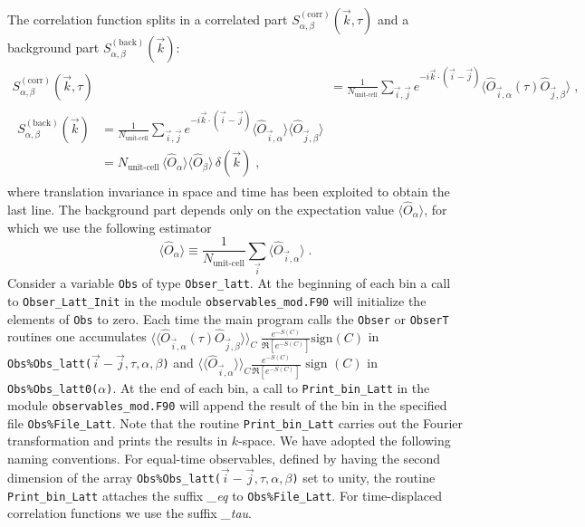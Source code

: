 The correlation function splits in a correlated part $S_{\alpha,\beta}^{\mathrm{(corr)}}(\vec{k},\tau)$ and a background part $S_{\alpha,\beta}^{\mathrm{(back)}}(\vec{k})$:
\begin{align}
S_{\alpha,\beta}^{\mathrm{(corr)}}(\vec{k},\tau)
&=
\frac{1}{N_{\text{unit-cell}}} \sum_{\vec{i},\vec{j}}  e^{- i\vec{k} \cdot \left( \vec{i}-\vec{j}\right) }  \langle \hat{O}_{\vec{i},\alpha} (\tau) \hat{O}_{\vec{j},\beta} \rangle \label{eqn:s_corr} \;,\\
\begin{split}
S_{\alpha,\beta}^{\mathrm{(back)}}(\vec{k})
&=
\frac{1}{N_{\text{unit-cell}}} \sum_{\vec{i},\vec{j}}  e^{- i\vec{k} \cdot \left( \vec{i}-\vec{j}\right) }  \langle \hat{O}_{\vec{i},\alpha} \rangle \langle \hat{O}_{\vec{j},\beta} \rangle\\
&=
N_{\text{unit-cell}}\, \langle \hat{O}_{\alpha} \rangle \langle \hat{O}_{\beta} \rangle \, \delta(\vec{k}) \label{eqn:s_back}\;,
\end{split}
\end{align}
where translation invariance in space and time has been exploited to obtain the last line. 
The background part depends only on the expectation value $\langle \hat{O}_{\alpha} \rangle$, for which we use the following estimator 
\begin{equation}\label{eqn:o}
\langle \hat{O}_{\alpha} \rangle \equiv \frac{1}{N_{\text{unit-cell}}} \sum\limits_{\vec{i}} \langle \hat{O}_{\vec{i},\alpha} \rangle\;.
\end{equation}
Consider a variable  \texttt{Obs} of type  \texttt{Obser\_latt}. At the beginning of each bin a call to  \texttt{Obser\_Latt\_Init} in the module \texttt{observables\_mod.F90}  will  initialize  the elements of \texttt{Obs} to zero.    Each time the main program calls the   \texttt{Obser} or  \texttt{ObserT} routines one accumulates $ \langle \langle \hat{O}_{\vec{i},\alpha} (\tau) \hat{O}_{\vec{j},\beta} \rangle \rangle_{C} \; \frac{e^{-S(C)}} {\Re \left[e^{-S(C)} \right]}  \text{sign}(C) $    in  \texttt{Obs\%Obs\_latt($\vec{i}-\vec{j},\tau,\alpha,\beta$)}   
and $ \langle \langle \hat{O}_{\vec{i},\alpha} \rangle \rangle_{C}\frac{e^{-S(C)}} {\Re \left[e^{-S(C)} \right]}  \text{ sign }(C) $  in \texttt{Obs\%Obs\_latt0($\alpha$)}.   At the end of each bin, a call to \texttt{Print\_bin\_Latt} in the module  \texttt{observables\_mod.F90}   will append the result of the bin in the specified  file \texttt{Obs\%File\_Latt}.   Note that the routine  \texttt{Print\_bin\_Latt}  carries out the Fourier transformation and prints the results in $k$-space. 
We have adopted the following naming conventions.
For equal-time observables, defined by having the second dimension of the array  \texttt{Obs\%Obs\_latt($\vec{i}-\vec{j},\tau,\alpha,\beta$)}   set to unity, 
the routine \texttt{Print\_bin\_Latt}  attaches the suffix \emph{\_eq} to \texttt{Obs\%File\_Latt}.  For time-displaced correlation functions we use the suffix \emph{\_tau}.


